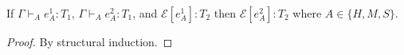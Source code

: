 \begin{lemma}
\label{ec}
If $\Gamma\vdash_{A}e_{A}^{1}:T_{1}$, $\Gamma\vdash_{A}e_{A}^{2}:T_{1}$, and $\mathscr{E}[e_{A}^{1}]:T_{2}$ then $\mathscr{E}[e_{A}^{2}]:T_{2}$ where $A\in\lbrace H,M,S\rbrace$.
\begin{proof}
By structural induction.
\end{proof}
\end{lemma}